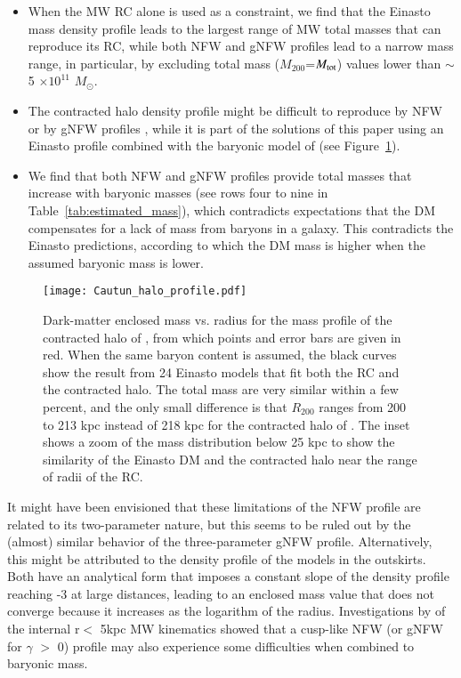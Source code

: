 \documentclass{aa}
\begin{document}
\begin{itemize}
\item When the MW RC alone is used as a constraint, we find that the Einasto mass density profile leads to the largest range of MW total masses that can reproduce its RC, while both NFW and gNFW profiles lead to a narrow mass range, in particular, by excluding total mass ($M_{200}$=$M_{\rm tot}$) values lower than $\sim$ 5 $\times 10^{11}$ $M_{\odot}$.
\item The contracted halo density profile might be difficult to  reproduce by NFW or by gNFW profiles \citep{Cautun2020}, while it is part of the solutions of this paper using an Einasto profile combined with the baryonic model of \citet{Cautun2020} (see Figure~\ref{fig:Cautun_halo_profile}).
\item We find that both NFW and gNFW profiles provide total masses that increase with baryonic masses (see rows four to nine  in Table~\ref{tab:estimated_mass}), which contradicts expectations that the DM compensates for a lack of mass from baryons in a galaxy. This contradicts the Einasto predictions, according to which the DM mass is higher when the assumed baryonic mass is lower. 
\end{itemize}

 
 \begin{figure}
 \texttt{[image: Cautun\_halo\_profile.pdf]}
    \caption{ Dark-matter enclosed mass vs. radius for the mass profile of the contracted halo of \citet{Cautun2020}, from which points and error bars are given in red. When the same baryon content is assumed, the black curves show the result from 24 Einasto models that fit both the RC and the contracted halo. The total mass are very similar within a few percent, and the only small difference is that $R_{200}$ ranges from 200 to 213 kpc instead of 218 kpc for  the contracted halo of \citealt{Cautun2020}. The inset shows a zoom of the mass distribution below 25 kpc to show the similarity of the Einasto DM and the contracted halo near the range of radii of the RC.}
    \label{fig:Cautun_halo_profile}
\end{figure}
 
It might have been envisioned that these limitations of the NFW profile are related to its two-parameter nature, but this seems to be ruled out by the (almost) similar behavior of the three-parameter gNFW profile. Alternatively, this might be attributed to the density profile of the models in the outskirts. Both have an analytical form that imposes a constant slope of the density profile reaching -3 at large distances, leading to an enclosed mass value that does not converge because it increases as the logarithm of the radius. Investigations by \citet{Nesti2013}  of the internal r$<$ 5kpc MW kinematics showed that a cusp-like NFW (or gNFW for $\gamma$ $>$ 0) profile may also experience some difficulties when combined to baryonic mass.
\end{document}
